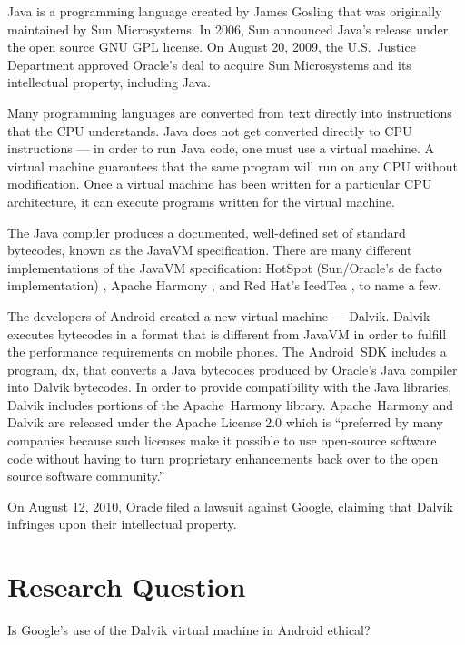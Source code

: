\documentclass[11pt]{article}
\begin{document}
\begin{multicols}{2}
Java is a programming language created by James Gosling that was originally
maintained by Sun Microsystems.  In 2006, Sun announced Java's release under the
open source GNU GPL license. \cite{sun-open-sources-java} On August 20, 2009,
the U.S.~Justice Department approved Oracle's deal to acquire Sun Microsystems
and its intellectual property, including Java. \cite{oracle-buys-sun}

Many programming languages are converted from text directly into instructions
that the CPU understands.  Java does not get converted directly to CPU
instructions --- in order to run Java code, one must use a virtual machine.  A
virtual machine guarantees that the same program will run on any CPU without
modification.  Once a virtual machine has been written for a particular CPU
architecture, it can execute programs written for the virtual machine.

The Java compiler produces a documented, well-defined set of standard bytecodes,
known as the JavaVM specification. \cite[Chapter 4]{javavm-bytecode}  There are
many different implementations of the JavaVM specification: HotSpot
(Sun/Oracle's de facto implementation) \cite{hotspot}, Apache Harmony
\cite{apache-harmony}, and Red Hat's IcedTea \cite{icedtea}, to name a few.

The developers of Android created a new virtual machine --- Dalvik.  Dalvik
executes bytecodes in a format that is different from JavaVM in order to fulfill
the performance requirements on mobile phones.  \cite{dalvik-bytecode}
\cite{dalvik-vm-arch} The Android~SDK includes a program, dx, that converts a
Java bytecodes produced by Oracle's Java compiler into Dalvik bytecodes.
\cite{android-sdk-building} In order to provide compatibility with the Java
libraries, Dalvik includes portions of the Apache~Harmony library.
\cite{apache-harmony} \cite{dalvik-readme}  Apache~Harmony and Dalvik are
released under the Apache License 2.0 \cite{apache-license} which is ``preferred
by many companies because such licenses make it possible to use open-source
software code without having to turn proprietary enhancements back over to the
open source software community.'' \cite{why-apache2-license}

On August 12, 2010, Oracle filed a lawsuit against Google, claiming that Dalvik
infringes upon their intellectual property. \cite[Count VIII]{oracle-lawsuit}


\section{Research Question} %
\label{sec:question}
Is Google's use of the Dalvik virtual machine in Android ethical?


\end{multicols}
\end{document}
